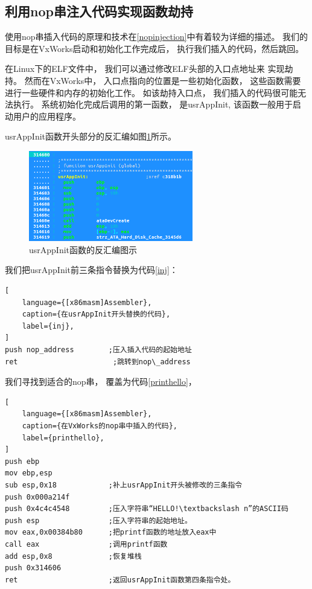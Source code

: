 \subsection{利用nop串注入代码实现函数劫持}

使用nop串插入代码的原理和技术在\ref{nopinjection}中有着较为详细的描述。
我们的目标是在VxWorks启动和初始化工作完成后，
执行我们插入的代码，然后跳回。

在Linux下的ELF文件中，
我们可以通过修改ELF头部的入口点地址来
实现劫持。
然而在VxWorks中，
入口点指向的位置是一些初始化函数，
这些函数需要进行一些硬件和内存的初始化工作。
如该劫持入口点，
我们插入的代码很可能无法执行。
系统初始化完成后调用的第一函数，
是usrAppInit,
该函数一般用于启动用户的应用程序。

usrAppInit函数开头部分的反汇编如图\ref{usr}所示。

\begin{figure}[h!]
    \centering
    \includegraphics[width=0.64\textwidth]{figure/usr.png}
    \caption{usrAppInit函数的反汇编图示}
    \label{usr}
\end{figure}

我们把usrAppInit前三条指令替换为代码\ref{inj}：

\begin{lstlisting}[
    language={[x86masm]Assembler},
    caption={在usrAppInit开头替换的代码},
    label={inj},
]
push nop_address        ;压入插入代码的起始地址
ret                      ;跳转到nop\_address
\end{lstlisting}


我们寻找到适合的nop串，
覆盖为代码\ref{printhello}，
\begin{lstlisting}[
    language={[x86masm]Assembler},
    caption={在VxWorks的nop串中插入的代码},
    label={printhello},
]
push ebp
mov ebp,esp
sub esp,0x18            ;补上usrAppInit开头被修改的三条指令
push 0x000a214f
push 0x4c4c4548         ;压入字符串“HELLO!\textbackslash n”的ASCII码
push esp                ;压入字符串的起始地址。  
mov eax,0x00384b80      ;把printf函数的地址放入eax中
call eax                ;调用printf函数
add esp,0x8             ;恢复堆栈
push 0x314606        
ret                     ;返回usrAppInit函数第四条指令处。
\end{lstlisting}

